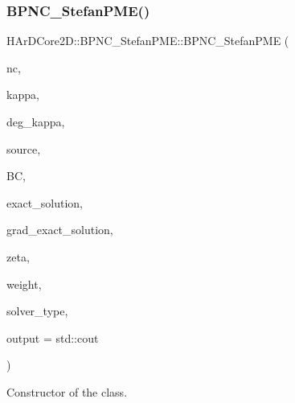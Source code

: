 \subsubsection{\texorpdfstring{B\+P\+N\+C\+\_\+\+Stefan\+P\+M\+E()}{BPNC\_StefanPME()}}
{\footnotesize\ttfamily H\+Ar\+D\+Core2\+D\+::\+B\+P\+N\+C\+\_\+\+Stefan\+P\+M\+E\+::\+B\+P\+N\+C\+\_\+\+Stefan\+P\+ME (\begin{DoxyParamCaption}\item[{\hyperlink{classHArDCore2D_1_1BPNCCore}{B\+P\+N\+C\+Core} \&}]{nc,  }\item[{\hyperlink{classHArDCore2D_1_1BPNC__StefanPME_aa07717e39892228c331b3cf3c29b086e}{tensor\+\_\+function\+\_\+type}}]{kappa,  }\item[{size\+\_\+t}]{deg\+\_\+kappa,  }\item[{\hyperlink{classHArDCore2D_1_1BPNC__StefanPME_a233ff438d25c93b72498ce3b461c8623}{source\+\_\+function\+\_\+type}}]{source,  }\item[{\hyperlink{classBoundaryConditions}{Boundary\+Conditions}}]{BC,  }\item[{\hyperlink{classHArDCore2D_1_1BPNC__StefanPME_ad0802f467317597f803c0dd45d26c3ba}{solution\+\_\+function\+\_\+type}}]{exact\+\_\+solution,  }\item[{\hyperlink{classHArDCore2D_1_1BPNC__StefanPME_a33d159dc2e762c21926b85a21e38c5d8}{grad\+\_\+function\+\_\+type}}]{grad\+\_\+exact\+\_\+solution,  }\item[{\hyperlink{classTestCaseNonLinearity_a3d8a5c89c517dd0d9c835b7441ee9b07}{Test\+Case\+Non\+Linearity\+::nonlinearity\+\_\+function\+\_\+type}}]{zeta,  }\item[{double}]{weight,  }\item[{std\+::string}]{solver\+\_\+type,  }\item[{std\+::ostream \&}]{output = {\ttfamily std\+:\+:cout} }\end{DoxyParamCaption})}



Constructor of the class. 


